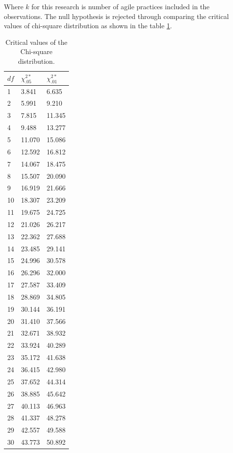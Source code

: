\documentclass[a4paper,oneside]{bth}
\begin{document}
Where $k$ for this research is number of agile practices included in the observations. The null hypothesis is rejected through comparing the critical values of chi-square distribution as shown in the table \ref{chi-square}.

\begin{longtable}[h]{|p{4cm}|p{4cm}|p{4cm}|}
\caption{Critical values of the Chi-square distribution.\label{chi-square}}\\
\hline
\textbf{$df$} & \textbf{$\chi^{2*}_.05$} & \textbf{$\chi^{2*}_.01$}\\ \hline
1&	3.841&	6.635\\ \hline
2&	5.991&	9.210\\ \hline
3&	7.815&	11.345\\ \hline
4&	9.488&	13.277\\ \hline
5&	11.070&	15.086\\ \hline
6&	12.592& 16.812\\ \hline
7&	14.067&	18.475\\ \hline
8&	15.507&	20.090\\ \hline
9&	16.919&	21.666\\ \hline
10&	18.307&	23.209\\ \hline
11&	19.675&	24.725\\ \hline
12&	21.026&	26.217\\ \hline
13&	22.362&	27.688\\ \hline
14&	23.485&	29.141\\ \hline
15&	24.996&	30.578\\ \hline
16&	26.296&	32.000\\ \hline
17&	27.587&	33.409\\ \hline
18&	28.869&	34.805\\ \hline
19&	30.144&	36.191\\ \hline
20&	31.410&	37.566\\ \hline
21&32.671&	38.932\\ \hline
22&	33.924&	40.289\\ \hline
23&	35.172&	41.638\\ \hline
24&	36.415&	42.980\\ \hline
25&	37.652&	44.314\\ \hline
26&	38.885&	45.642\\ \hline
27&	40.113&	46.963\\ \hline
28&	41.337&	48.278\\ \hline
29&	42.557&	49.588\\ \hline
30&	43.773&	50.892\\ \hline

\end{longtable}
\end{document}
